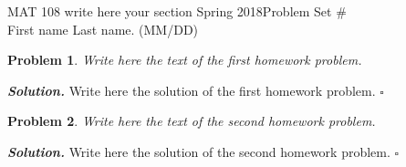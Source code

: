 \documentclass[12pt]{article}
\newtheorem{problem}{Problem}
\newenvironment{solution}[1][\it{Solution}]{\textbf{#1. } }{$\square$}
\begin{document}
\noindent MAT 108 write here your section Spring 2018\hfill Problem Set \#\\
First name Last name. (MM/DD)

\hrulefill


\begin{problem}
Write here the text of the first homework problem.
\end{problem}
\begin{solution}
	Write here the solution of the first homework problem.
\end{solution} 

\hrulefill
\begin{problem}
Write here the text of the second homework problem.
\end{problem}
\begin{solution}
	Write here the solution of the second homework problem.
\end{solution}

 
\end{document}
